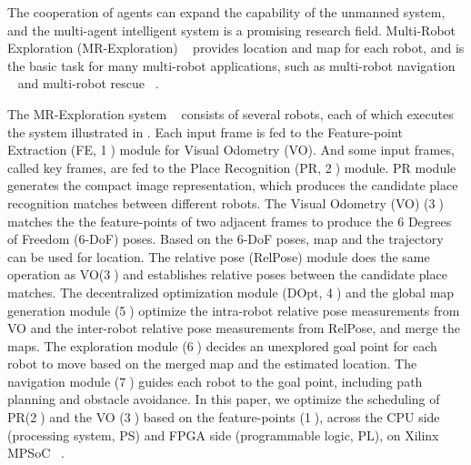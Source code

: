 \label{sec:intro}

The cooperation of agents can expand the capability of the unmanned system, and the multi-agent intelligent system is a promising research field.
Multi-Robot Exploration (MR-Exploration)  ~\cite{corah2019communication} provides location and map for each robot, and is the basic task for many multi-robot applications, such as multi-robot navigation  ~\cite{tanner2005towards} and multi-robot rescue  ~\cite{baxter2007multi}.

The  MR-Exploration system  ~\cite{corah2019communication, cieslewski2018data} consists of several robots, each of which executes the system illustrated in . Each input frame is fed to the Feature-point Extraction (FE, \textcircled{1}) module for Visual Odometry (VO). 
And some input frames, called key frames, are fed to the Place Recognition (PR, \textcircled{2}) module.
PR module generates the compact image representation, which produces the candidate place recognition matches between different robots. The Visual Odometry (VO) (\textcircled{3}) matches the the feature-points of two adjacent frames to produce the 6 Degrees of Freedom (6-DoF) poses. Based on the 6-DoF poses,  map and the trajectory can be used for location. The relative pose (RelPose) module does the same operation as VO(\textcircled{3}) and establishes relative poses between the candidate place matches. The decentralized optimization module (DOpt, \textcircled{4}) and the global map generation module (\textcircled{5}) optimize the intra-robot relative pose measurements from VO and the inter-robot relative pose measurements from RelPose, and merge the maps. The exploration module (\textcircled{6}) decides an unexplored goal point for each robot to move based on the merged map and the estimated location. The navigation module (\textcircled{7}) guides each robot to the goal point, including path planning and obstacle avoidance.
In this paper, we optimize the scheduling of PR(\textcircled{2}) and the VO (\textcircled{3}) based on the feature-points (\textcircled{1}), across the CPU side (processing system, PS) and FPGA side (programmable logic, PL), on Xilinx MPSoC  ~\cite{MPSoC}.

